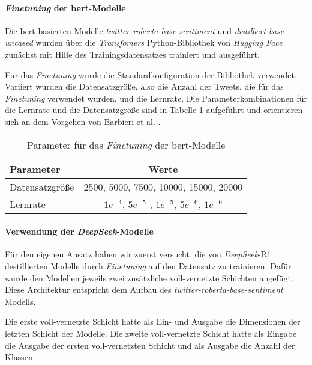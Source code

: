 \paragraph{\textit{Finetuning} der \gls{bert}-Modelle}

Die \gls{bert}-basierten Modelle \textit{twitter-roberta\hyp{}base\hyp{}sentiment} und \textit{distilbert-base-uncased} wurden über die \textit{Transfomers} Python-Bibliothek von \textit{Hugging Face} zunächst mit Hilfe des Trainingsdatensatzes trainiert und ausgeführt.

Für das \textit{Finetuning} wurde die Standardkonfiguration der Bibliothek verwendet.
Variiert wurden die Datensatzgröße, also die Anzahl der Tweets, die für das \textit{Finetuning} verwendet wurden, und die Lernrate.
Die Parameterkombinationen für die Lernrate und die Datensatzgröße sind in Tabelle \ref{tab:dl-params} aufgeführt und orientieren sich an dem Vorgehen von Barbieri et al. \cite{barbieri2020tweeteval}.
\begin{table}
    \center
    \begin{tabular}{lc}
        \toprule
        Parameter       & Werte                                                   \\
        \midrule
        Datensatzgröße  & 2500, 5000, 7500, 10000, 15000, 20000                   \\
        Lernrate        & $1e^{-4}$, $5e^{-5}$ , $1e^{-5}$, $5e^{-6}$, $1e^{-6}$  \\
        \bottomrule
    \end{tabular}
    \caption{Parameter für das \textit{Finetuning} der \gls{bert}-Modelle}
    \label{tab:dl-params}
\end{table}

\paragraph{Verwendung der \textit{DeepSeek}-Modelle}

Für den eigenen Ansatz haben wir zuerst versucht, die von \textit{DeepSeek}-R1 destillierten Modelle durch \textit{Finetuning} auf den Datensatz zu trainieren.
Dafür wurde den Modellen jeweils zwei zusätzliche voll-vernetzte Schichten angefügt.
Diese Architektur entspricht dem Aufbau des \textit{twitter-roberta-base-sentiment} Modells.

Die erste voll-vernetzte Schicht hatte als Ein- und Ausgabe die Dimensionen der letzten Schicht der Modelle.
Die zweite voll-vernetzte Schicht hatte als Eingabe die Ausgabe der ersten voll-vernetzten Schicht und als Ausgabe die Anzahl der Klassen.

